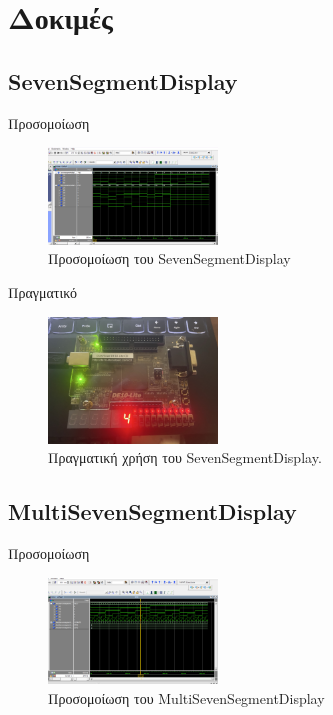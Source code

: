 \documentclass[conference]{IEEEtran}
\begin{document}
\section{Δοκιμές}
\subsection{SevenSegmentDisplay}

Προσομοίωση
\begin{figure}[H]
	\centerline{\includegraphics[width=0.4\textwidth]{assets/ssd-tb.png}}
	\caption{Προσομοίωση του SevenSegmentDisplay}
\end{figure}

Πραγματικό
\begin{figure}[H]
	\centerline{\includegraphics[angle=90, width=0.4\textwidth]{assets/ssd-real.jpeg}}
	\caption{Πραγματική χρήση του SevenSegmentDisplay.}
\end{figure}

\subsection{MultiSevenSegmentDisplay}

Προσομοίωση
\begin{figure}[H]
	\centerline{\includegraphics[width=0.4\textwidth]{assets/mssd-tb.png}}
	\caption{Προσομοίωση του MultiSevenSegmentDisplay}
\end{figure}
\end{document}
